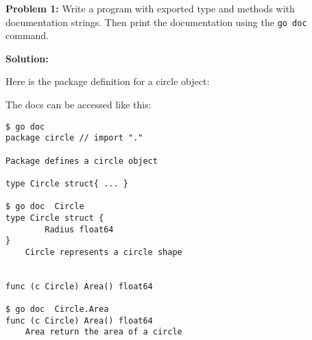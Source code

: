 {\bfseries Problem 1:} Write a program with exported type and methods
with documentation strings.  Then print the documentation
using the \texttt{go doc} command.

\textbf{Solution:}

Here is the package definition for a circle object:



The docs can be accessed like this:

\begin{lstlisting}[numbers=none]
$ go doc
package circle // import "."

Package defines a circle object

type Circle struct{ ... }

$ go doc  Circle
type Circle struct {
        Radius float64
}
    Circle represents a circle shape


func (c Circle) Area() float64

$ go doc  Circle.Area
func (c Circle) Area() float64
    Area return the area of a circle
\end{lstlisting}
